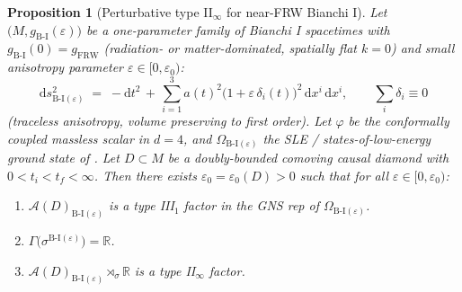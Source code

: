 \documentclass[11pt]{article}
\newtheorem{proposition}[theorem]{Proposition}
\theoremstyle{definition}
\newcommand{\R}{\mathbb{R}}
\renewcommand{\AA}{\mathcal{A}}
\newcommand{\FRW}{\mathrm{FRW}}
\newcommand{\BI}{\mathrm{B\text{-}I}}
\begin{document}
\begin{proposition}[Perturbative type II$_\infty$ for near-FRW Bianchi I]\label{prop:B1}
Let $\bigl(M, g_\BI(\varepsilon)\bigr)$ be a one-parameter family of Bianchi I spacetimes with $g_\BI(0) = g_\FRW$ (radiation- or matter-dominated, spatially flat $k=0$) and small anisotropy parameter $\varepsilon\in[0,\varepsilon_0)$:
\begin{equation}\label{eq:perturb-metric}
\mathrm{d}s^2_{\BI(\varepsilon)} \;=\; -\mathrm dt^2
   \,+\, \sum_{i=1}^3 a(t)^2 \bigl(1 + \varepsilon\,\delta_i(t)\bigr)^2\,\mathrm dx^i\,\mathrm dx^i,
\qquad \sum_i \delta_i \equiv 0
\end{equation}
(traceless anisotropy, volume preserving to first order). Let $\varphi$ be the conformally coupled massless scalar in $d=4$, and $\Omega_{\BI(\varepsilon)}$ the SLE / states-of-low-energy ground state of \cite{BanerjeeNiedermaier2023, BrumThem2013}. Let $D\subset M$ be a doubly-bounded comoving causal diamond with $0<t_i<t_f<\infty$. Then there exists $\varepsilon_0 = \varepsilon_0(D)>0$ such that for all $\varepsilon\in[0,\varepsilon_0)$:
\begin{enumerate}
\item $\AA(D)_{\BI(\varepsilon)}$ is a type III$_1$ factor in the GNS rep of $\Omega_{\BI(\varepsilon)}$.
\item $\Gamma\bigl(\sigma^{\BI(\varepsilon)}\bigr) = \R$.
\item $\AA(D)_{\BI(\varepsilon)} \rtimes_\sigma \R$ is a type II$_\infty$ factor.
\end{enumerate}
\end{proposition}
\end{document}
